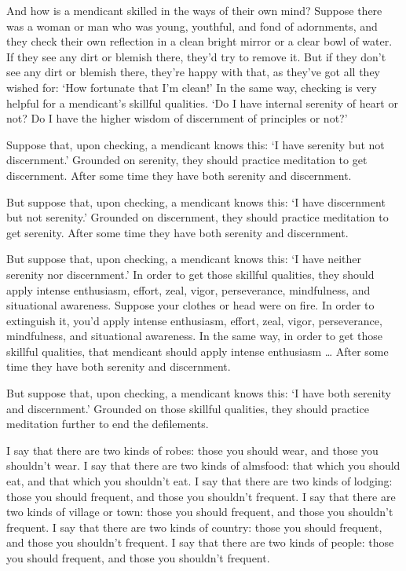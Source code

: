 \documentclass[12pt,openany]{book}%
\begin{document}
And how is a mendicant skilled in the ways of their own mind? Suppose there was a woman or man who was young, youthful, and fond of adornments, and they check their own reflection in a clean bright mirror or a clear bowl of water. If they see any dirt or blemish there, they’d try to remove it. But if they don’t see any dirt or blemish there, they’re happy with that, as they’ve got all they wished for: ‘How fortunate that I’m clean!’ In the same way, checking is very helpful for a mendicant’s skillful qualities. ‘Do I have internal serenity of heart or not? Do I have the higher wisdom of discernment of principles or not?’ 

Suppose that, upon checking, a mendicant knows this: ‘I have serenity but not discernment.’ Grounded on serenity, they should practice meditation to get discernment. After some time they have both serenity and discernment. 

But suppose that, upon checking, a mendicant knows this: ‘I have discernment but not serenity.’ Grounded on discernment, they should practice meditation to get serenity. After some time they have both serenity and discernment. 

But suppose that, upon checking, a mendicant knows this: ‘I have neither serenity nor discernment.’ In order to get those skillful qualities, they should apply intense enthusiasm, effort, zeal, vigor, perseverance, mindfulness, and situational awareness. Suppose your clothes or head were on fire. In order to extinguish it, you’d apply intense enthusiasm, effort, zeal, vigor, perseverance, mindfulness, and situational awareness. In the same way, in order to get those skillful qualities, that mendicant should apply intense enthusiasm … After some time they have both serenity and discernment. 

But suppose that, upon checking, a mendicant knows this: ‘I have both serenity and discernment.’ Grounded on those skillful qualities, they should practice meditation further to end the defilements. 

I say that there are two kinds of robes: those you should wear, and those you shouldn’t wear. I say that there are two kinds of almsfood: that which you should eat, and that which you shouldn’t eat. I say that there are two kinds of lodging: those you should frequent, and those you shouldn’t frequent. I say that there are two kinds of village or town: those you should frequent, and those you shouldn’t frequent. I say that there are two kinds of country: those you should frequent, and those you shouldn’t frequent. I say that there are two kinds of people: those you should frequent, and those you shouldn’t frequent. 
\end{document}
